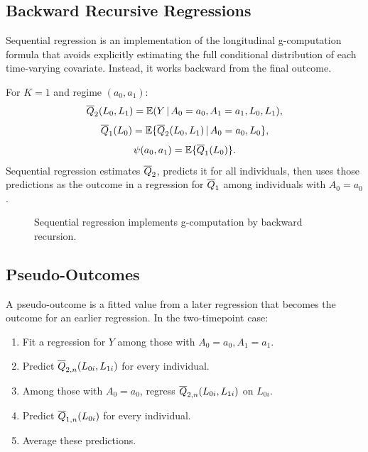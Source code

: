 \label{lec:8-7}

\subsection{Backward Recursive Regressions}

Sequential regression is an implementation of the longitudinal g-computation
formula that avoids explicitly estimating the full conditional distribution of
each time-varying covariate. Instead, it works backward from the final outcome.

For $K=1$ and regime $(a_0,a_1)$:
\[
  \overline{Q}_2(L_0,L_1)=\mathbb{E}(Y\,\vert\, A_0=a_0,A_1=a_1,L_0,L_1),
\]
\[
  \overline{Q}_1(L_0)=\mathbb{E}\{\overline{Q}_2(L_0,L_1)\,\vert\, A_0=a_0,L_0\},
\]
\[
  \psi(a_0,a_1)=\mathbb{E}\{\overline{Q}_1(L_0)\}.
\]
Sequential regression estimates $\overline{Q}_2$, predicts it for all individuals, then
uses those predictions as the outcome in a regression for $\overline{Q}_1$ among
individuals with $A_0=a_0$.

\begin{figure}[H]
\centering
{}
\caption{Sequential regression implements g-computation by backward recursion.}
\label{fig:ch8-sequential-regression}
\end{figure}

\subsection{Pseudo-Outcomes}

A pseudo-outcome is a fitted value from a later regression that becomes the
outcome for an earlier regression. In the two-timepoint case:
\begin{enumerate}
  \item Fit a regression for $Y$ among those with $A_0=a_0,A_1=a_1$.
  \item Predict $\overline{Q}_{2,n}(L_{0i},L_{1i})$ for every individual.
  \item Among those with $A_0=a_0$, regress $\overline{Q}_{2,n}(L_{0i},L_{1i})$ on
  $L_{0i}$.
  \item Predict $\overline{Q}_{1,n}(L_{0i})$ for every individual.
  \item Average these predictions.
\end{enumerate}


